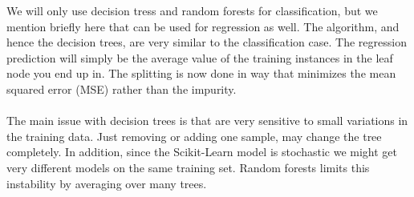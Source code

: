 \documentclass[12pt]{article}
\numberwithin{figure}{section}
\begin{document}
We will only use decision tress and random forests for classification, but we mention briefly here that can be used for regression as well. The algorithm, and hence the decision trees, are very similar to the classification case. The regression prediction will simply be the average value of the training instances in the leaf node you end up in. The splitting is now done in way that minimizes the mean squared error (MSE) rather than the impurity.\\ \\
The main issue with decision trees is that are very sensitive to small variations in the training data. Just removing or adding one sample, may change the tree completely. In addition, since the Scikit-Learn model is stochastic we might get very different models on the same training set.  Random forests limits this instability by averaging over many trees.\\ \\
\end{document}
